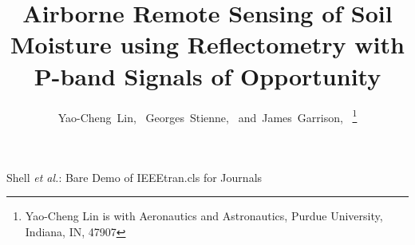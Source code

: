 \documentclass[draftcls,onecolumn]{IEEEtran}  %
\begin{document}
%
\title{Airborne Remote Sensing of Soil Moisture using Reflectometry with P-band Signals of Opportunity}
%
%
%

\author{Yao-Cheng~Lin,~
        Georges~Stienne,~
        and~James~Garrison,~%
\thanks{Yao-Cheng Lin is with Aeronautics and Astronautics, Purdue University, Indiana,
IN, 47907}}

% 
%



%
{Shell \MakeLowercase{\textit{et al.}}: Bare Demo of IEEEtran.cls for Journals}
% 
\end{document}
